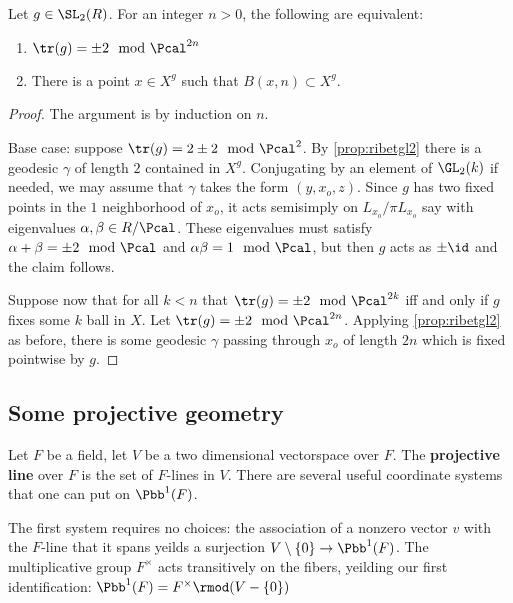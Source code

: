 \documentclass{amsart}
\begin{document}
\begin{prop}
	Let $g\in \SL_{2}(R)$. For an integer $n >0$, the following are equivalent:
	\begin{enumerate}
		\item $\tr(g) = \pm 2 \mod \Pcal^{2n}$
		\item There is a point $x \in X^{g}$ such that $B(x,n)\subset X^{g}$.
	\end{enumerate}
\end{prop}
\begin{proof}
	The argument is by induction on $n$.

	Base case: suppose $\tr(g)=2 \pm 2 \mod \Pcal^{2}$. By \cref{prop:ribetgl2} there is a geodesic $\gamma$ of length $2$ contained in $X^{g}$.  Conjugating by an element of $\GL_{2}(k)$ if needed, we may assume that $\gamma$ takes the form $(y, x_{o},z)$. Since $g$ has two fixed points in the $1$ neighborhood of $x_{o}$, it acts semisimply on $L_{x_o}/\pi L_{x_{o}}$ say with eigenvalues $\alpha,\beta \in R/\Pcal$. These eigenvalues must satisfy $\alpha + \beta =\pm 2 \mod \Pcal$ and $\alpha \beta = 1  \mod \Pcal$, but then $g$ acts as $\pm \id$ and the claim follows.

	Suppose now that for all $k<n$ that $\tr(g) = \pm 2 \mod \Pcal^{2k}$ iff and only if $g$ fixes some $k$ ball in $X$. Let $\tr(g) = \pm 2 \mod \Pcal^{2n}$. Applying \cref{prop:ribetgl2}  as before, there is some geodesic $\gamma$ passing through $x_{o}$ of length $2n$ which is fixed pointwise by $g$.


\end{proof}


\subsection{Some projective geometry}
Let $F$ be a field, let $V$ be a two dimensional vectorspace over $F$. The \textbf{projective line} over $F$ is the set of $F$-lines in $V$. There are several useful coordinate systems that one can put on $\Pbb^{1}(F)$.

The first system requires no choices: the association of a nonzero vector $v$ with the $F$-line that it spans yeilds a surjection $V\setminus \{0\} \to \Pbb^{1}(F)$. The multiplicative group $F^{\times}$ acts transitively on the fibers, yeilding our first identification: $\Pbb^{1}(F) = F^{\times}\rmod (V - \{0\})$
\end{document}
